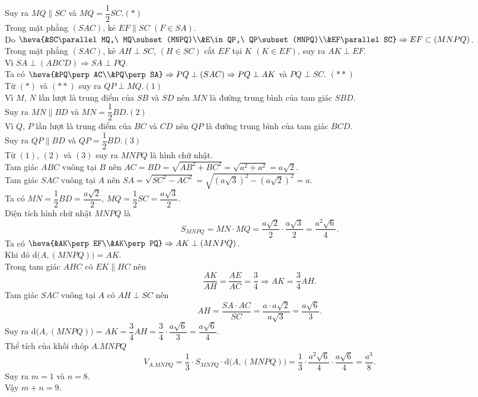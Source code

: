 \begin{ex}
{		Suy ra $MQ\parallel SC$ và $MQ=\dfrac{1}{2}SC$.\quad $(*)$\\
		Trong mặt phẳng $(SAC)$, kẻ $EF\parallel SC$ $(F\in SA)$.\\
		Do $\heva{&SC\parallel MQ,\ MQ\subset (MNPQ)\\&E\in QP,\ QP\subset (MNPQ)\\&EF\parallel SC}\Rightarrow EF\subset (MNPQ)$.\\
		Trong mặt phẳng $(SAC)$, kẻ $AH\perp SC$, $(H\in SC)$ cắt $EF$ tại $K$ $(K\in EF)$, suy ra $AK\perp EF$.\\
		Vì $SA\perp (ABCD)\Rightarrow SA\perp PQ$.\\
		Ta có $\heva{&PQ\perp AC\\&PQ\perp SA}\Rightarrow PQ\perp (SAC) \Rightarrow PQ\perp AK$ và $PQ\perp SC$. \quad $(**)$\\
		Từ $(*)$ và $(**)$ suy ra $QP\perp MQ$.\hfill {$(1)$}\\
		Vì $M$, $N$ lần lượt là trung điểm của $SB$ và $SD$ nên $MN$ là đường trung bình của tam giác $SBD$.\\
		Suy ra $MN\parallel BD$ và $MN=\dfrac{1}{2}BD$.\hfill {$(2)$}\\
		Vì $Q$, $P$ lần lượt là trung điểm của $BC$ và $CD$ nên $QP$ là đường trung bình của tam giác $BCD$.\\
		Suy ra $QP\parallel BD$ và $QP=\dfrac{1}{2}BD$.\hfill {$(3)$}\\
		Từ $(1)$, $(2)$ và $(3)$ suy ra $MNPQ$ là hình chữ nhật.\\
		Tam giác $ABC$ vuông tại $B$ nên $AC=BD=\sqrt{AB^2+BC^2}=\sqrt{a^2+a^2}=a\sqrt{2}$.\\
		Tam giác $SAC$ vuông tại $A$ nên $SA=\sqrt{SC^2-AC^2}=\sqrt{\left(a\sqrt{3}\right)^2-\left(a\sqrt{2}\right)^2}=a$.\\
		Ta có $MN=\dfrac{1}{2}BD=\dfrac{a\sqrt{2}}{2}$, $MQ=\dfrac{1}{2}SC=\dfrac{a\sqrt{3}}{2}$.\\
		Diện tích hình chữ nhật $MNPQ$ là 
		\[S_{MNPQ}=MN\cdot MQ=\dfrac{a\sqrt{2}}{2}\cdot\dfrac{a\sqrt{3}}{2}=\dfrac{a^2\sqrt{6}}{4}.\]
		Ta có $\heva{&AK\perp EF\\&AK\perp PQ}\Rightarrow AK\perp (MNPQ)$.\\
		Khi đó $\mathrm{d}\big(A,(MNPQ)\big)=AK$.\\
		Trong tam giác $AHC$ có $EK\parallel HC$ nên
		\[\dfrac{AK}{AH}=\dfrac{AE}{AC}=\dfrac{3}{4}\Rightarrow AK=\dfrac{3}{4}AH.\]
		Tam giác $SAC$ vuông tại $A$ có $AH\perp SC$ nên
		\[AH=\dfrac{SA\cdot AC}{SC}=\dfrac{a\cdot a\sqrt{2}}{a\sqrt{3}}=\dfrac{a\sqrt{6}}{3}.\]
		Suy ra $\mathrm{d}\big(A,(MNPQ)\big)=AK=\dfrac{3}{4}AH=\dfrac{3}{4}\cdot \dfrac{a\sqrt{6}}{3}=\dfrac{a\sqrt{6}}{4}$.\\
		Thể tích của khối chóp $A.MNPQ$
		\[V_{A.MNPQ}=\dfrac{1}{3}\cdot S_{MNPQ}\cdot \mathrm{d}\big(A,(MNPQ)\big)=\dfrac{1}{3}\cdot \dfrac{a^2\sqrt{6}}{4}\cdot \dfrac{a\sqrt{6}}{4}=\dfrac{a^3}{8}.\]
		Suy ra $m=1$ và $n=8$.\\
		Vậy $m+n=9$.
	}
\end{ex}

